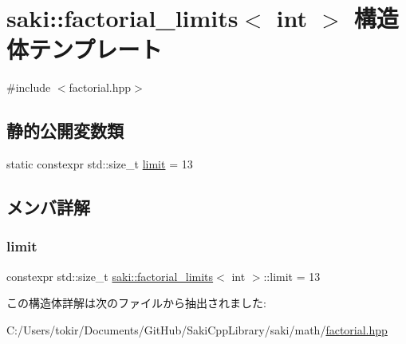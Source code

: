 \hypertarget{structsaki_1_1factorial__limits_3_01int_01_4}{}\section{saki\+:\+:factorial\+\_\+limits$<$ int $>$ 構造体テンプレート}
\label{structsaki_1_1factorial__limits_3_01int_01_4}


{\ttfamily \#include $<$factorial.\+hpp$>$}

\subsection*{静的公開変数類}
\begin{DoxyCompactItemize}
\item 
static constexpr std\+::size\+\_\+t \mbox{\hyperlink{structsaki_1_1factorial__limits_3_01int_01_4_a871afc099e8f2e2369dfa68170c8590a}{limit}} = 13
\end{DoxyCompactItemize}


\subsection{メンバ詳解}
\mbox{\label{structsaki_1_1factorial__limits_3_01int_01_4_a871afc099e8f2e2369dfa68170c8590a}} 
\subsubsection{\texorpdfstring{limit}{limit}}
{\footnotesize\ttfamily constexpr std\+::size\+\_\+t \mbox{\hyperlink{structsaki_1_1factorial__limits}{saki\+::factorial\+\_\+limits}}$<$ int $>$\+::limit = 13\hspace{0.3cm}{\ttfamily [static]}}



この構造体詳解は次のファイルから抽出されました\+:\begin{DoxyCompactItemize}
\item 
C\+:/\+Users/tokir/\+Documents/\+Git\+Hub/\+Saki\+Cpp\+Library/saki/math/\mbox{\hyperlink{factorial_8hpp}{factorial.\+hpp}}\end{DoxyCompactItemize}
